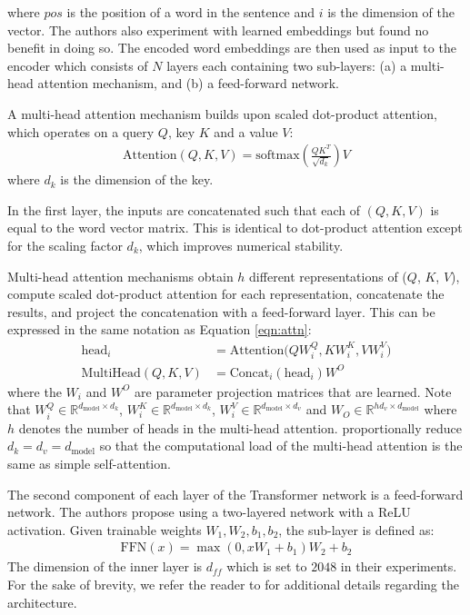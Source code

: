 \documentclass{article} %
\begin{document}
where $pos$ is the position of a word in the sentence and $i$ is the dimension of the vector.
The authors also experiment with learned embeddings \citep{gehring2016convenc,gehring2017convs2s} but found no benefit in doing so. The encoded word embeddings are then used as input to the encoder which consists of $N$ layers each containing two sub-layers: (a) a multi-head attention mechanism, and (b) a feed-forward network. 
 
A multi-head attention mechanism builds upon scaled dot-product attention, which operates on a query $Q$, key $K$ and a value $V$:
\begin{align}
\text{Attention}(Q,K,V) = \text{softmax} \left( \frac{QK^T}{\sqrt{d_k}} \right) V \label{eqn:attn}
\end{align}
where $d_k$ is the dimension of the key. 

In the first layer, the inputs are concatenated such that each of $(Q,K,V)$ is equal to the word vector matrix. 
This is identical to dot-product attention except for the scaling factor $d_k$, which improves numerical stability. 

Multi-head attention mechanisms obtain $h$ different representations of ($Q$, $K$, $V$), compute scaled dot-product attention for each representation, concatenate the results, and project the concatenation with a feed-forward layer. This can be expressed in the same notation as Equation \eqref{eqn:attn}:
\begin{align}
\text{head}_i &= \text{Attention(}QW_i^Q,KW_i^K,VW_i^V\text{)} \\
\text{MultiHead}(Q,K,V) &= \text{Concat}_i (\text{head}_i)W^O \label{eqn:multihead}
\end{align} 
where the $W_i$ and $W^O$ are parameter projection matrices that are learned. Note that $W_i^Q \in \mathbb{R}^{d_{\text{model}} \times d_k}$,  $W_i^K \in \mathbb{R}^{d_{\text{model}} \times d_k}$, $W_i^V \in \mathbb{R}^{d_{\text{model}} \times d_v}$ and $W_O \in \mathbb{R}^{hd_v \times d_{\text{model}}}$ where $h$ denotes the number of heads in the multi-head attention. \citet{vaswani2017attention}  proportionally reduce $d_k = d_v = d_{\text{model}}$ so that the computational load of the multi-head attention is the same as simple self-attention.

The second component of each layer of the Transformer network is a feed-forward network. The authors propose using a two-layered network with a ReLU activation. Given trainable weights $W_1,W_2,b_1,b_2$, the sub-layer is defined as:
\begin{align}
\text{FFN}(x) = \max(0, xW_1+b_1)W_2 + b_2 \label{eqn:ffn}
\end{align}
The dimension of the inner layer is $d_{ff}$ which is set to $2048$ in their experiments. For the sake of brevity, we refer the reader to \cite{vaswani2017attention} for additional details regarding the architecture.
\end{document}

